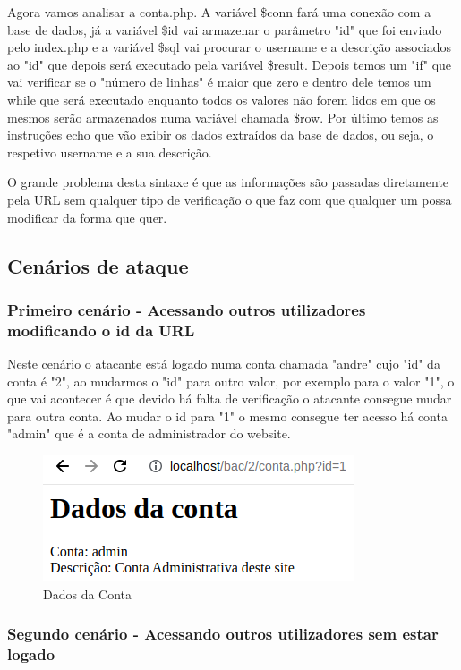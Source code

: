 \documentclass{report}
\begin{document}
Agora vamos analisar a conta.php. A variável \$conn fará uma conexão com a base de dados, já a variável \$id vai armazenar o parâmetro "id" que foi enviado pelo index.php e a variável \$sql vai procurar o username e a descrição associados ao "id" que depois será executado pela variável \$result. Depois temos um "if" que vai verificar se o "número de linhas" é maior que zero e dentro dele temos um while que será executado enquanto todos os valores não forem lidos em que os mesmos serão armazenados numa variável chamada \$row. Por último temos as instruções echo que vão exibir os dados extraídos da base de dados, ou seja, o respetivo username e a sua descrição.

O grande problema desta sintaxe é que as informações são passadas diretamente pela URL sem qualquer tipo de verificação o que faz com que qualquer um possa modificar da forma que quer.
\clearpage
\subsection{Cenários de ataque}

\subsubsection{Primeiro cenário - Acessando outros utilizadores modificando o id da URL}

Neste cenário o atacante está logado numa conta chamada "andre" cujo "id" da conta é "2", ao mudarmos o "id" para outro valor, por exemplo para o valor "1", o que vai acontecer é que devido há falta de verificação o atacante consegue mudar para outra conta. Ao mudar o id para "1" o mesmo consegue ter acesso há conta "admin" que é a conta de administrador do website.

\begin{figure}[h]
 \centering
 \includegraphics[scale=0.3]{imagesbac/bac3.png}
 \caption{Dados da Conta}
\end{figure}

\subsubsection{Segundo cenário - Acessando outros utilizadores sem estar logado}
\end{document}
